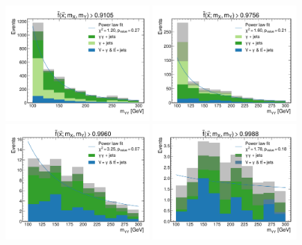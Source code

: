 \begin{figure}
    \centering
    \includegraphics[width=0.49\textwidth]{Figures/Dihiggs/categorisation/mgg_sculpting/y_gg_high_mass_original/all_bkg/intermediate_transformed_score_NMSSM_XYH_Y_gg_H_tautau_MX_400_MY_200_frac_uncert_0.05.pdf}
    \includegraphics[width=0.49\textwidth]{Figures/Dihiggs/categorisation/mgg_sculpting/y_gg_high_mass_original/all_bkg/intermediate_transformed_score_NMSSM_XYH_Y_gg_H_tautau_MX_400_MY_200_frac_uncert_0.1.pdf} \\
    \includegraphics[width=0.49\textwidth]{Figures/Dihiggs/categorisation/mgg_sculpting/y_gg_high_mass_original/exclude_gjet/intermediate_transformed_score_NMSSM_XYH_Y_gg_H_tautau_MX_400_MY_200_frac_uncert_0.05.pdf}
    \includegraphics[width=0.49\textwidth]{Figures/Dihiggs/categorisation/mgg_sculpting/y_gg_high_mass_original/exclude_gjet/intermediate_transformed_score_NMSSM_XYH_Y_gg_H_tautau_MX_400_MY_200_frac_uncert_0.1.pdf} \\

\end{figure}
